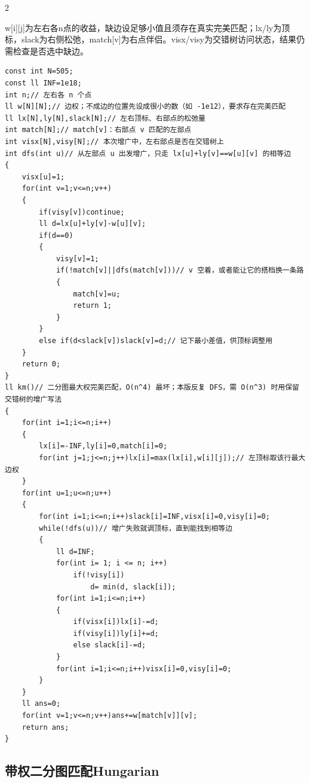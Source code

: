 \documentclass[UTF8,fontset=fandol,a4paper,twoside]{ctexart}
\newcommand{\note}[1]{{\fontsize{10}{12}\selectfont #1\par}}
\begin{document}
\begin{multicols}{2}
\note{w[\allowbreak{}i]\allowbreak{}[\allowbreak{}j]\allowbreak{}为左右各n点的收益，缺边设足够小值且须存在真实完美匹配；lx/\allowbreak{}ly为顶标，slack为右侧松弛，match[\allowbreak{}v]\allowbreak{}为右点伴侣。visx/\allowbreak{}visy为交错树访问状态，结果仍需检查是否选中缺边。}
\begin{lstlisting}
const int N=505;
const ll INF=1e18;
int n;// 左右各 n 个点
ll w[N][N];// 边权；不成边的位置先设成很小的数（如 -1e12），要求存在完美匹配
ll lx[N],ly[N],slack[N];// 左右顶标、右部点的松弛量
int match[N];// match[v]：右部点 v 匹配的左部点
int visx[N],visy[N];// 本次增广中，左右部点是否在交错树上
int dfs(int u)// 从左部点 u 出发增广，只走 lx[u]+ly[v]==w[u][v] 的相等边
{
    visx[u]=1;
    for(int v=1;v<=n;v++)
    {
        if(visy[v])continue;
        ll d=lx[u]+ly[v]-w[u][v];
        if(d==0)
        {
            visy[v]=1;
            if(!match[v]||dfs(match[v]))// v 空着，或者能让它的搭档换一条路
            {
                match[v]=u;
                return 1;
            }
        }
        else if(d<slack[v])slack[v]=d;// 记下最小差值，供顶标调整用
    }
    return 0;
}
ll km()// 二分图最大权完美匹配，O(n^4) 最坏；本版反复 DFS，需 O(n^3) 时用保留交错树的增广写法
{
    for(int i=1;i<=n;i++)
    {
        lx[i]=-INF,ly[i]=0,match[i]=0;
        for(int j=1;j<=n;j++)lx[i]=max(lx[i],w[i][j]);// 左顶标取该行最大边权
    }
    for(int u=1;u<=n;u++)
    {
        for(int i=1;i<=n;i++)slack[i]=INF,visx[i]=0,visy[i]=0;
        while(!dfs(u))// 增广失败就调顶标，直到能找到相等边
        {
            ll d=INF;
            for(int i= 1; i <= n; i++)
                if(!visy[i])
                    d= min(d, slack[i]);
            for(int i=1;i<=n;i++)
            {
                if(visx[i])lx[i]-=d;
                if(visy[i])ly[i]+=d;
                else slack[i]-=d;
            }
            for(int i=1;i<=n;i++)visx[i]=0,visy[i]=0;
        }
    }
    ll ans=0;
    for(int v=1;v<=n;v++)ans+=w[match[v]][v];
    return ans;
}
\end{lstlisting}
\subsection{带权二分图匹配Hungarian}


\end{multicols}
\end{document}
